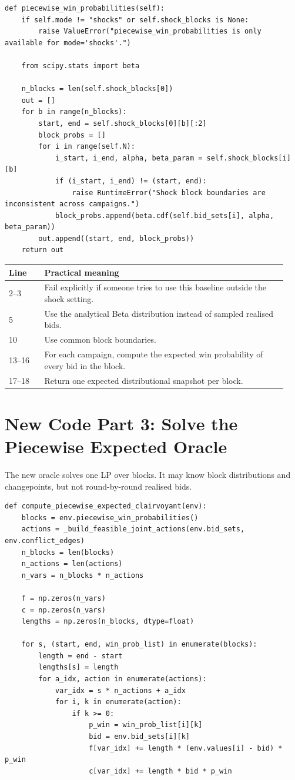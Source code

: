 \documentclass[10pt,a4paper]{article}
\begin{document}
\begin{lstlisting}[style=goodpython]
def piecewise_win_probabilities(self):
    if self.mode != "shocks" or self.shock_blocks is None:
        raise ValueError("piecewise_win_probabilities is only available for mode='shocks'.")

    from scipy.stats import beta

    n_blocks = len(self.shock_blocks[0])
    out = []
    for b in range(n_blocks):
        start, end = self.shock_blocks[0][b][:2]
        block_probs = []
        for i in range(self.N):
            i_start, i_end, alpha, beta_param = self.shock_blocks[i][b]
            if (i_start, i_end) != (start, end):
                raise RuntimeError("Shock block boundaries are inconsistent across campaigns.")
            block_probs.append(beta.cdf(self.bid_sets[i], alpha, beta_param))
        out.append((start, end, block_probs))
    return out
\end{lstlisting}

\begin{tabular}{@{}p{0.12\linewidth}p{0.82\linewidth}@{}}
\toprule
Line & Practical meaning \\
\midrule
2--3 & Fail explicitly if someone tries to use this baseline outside the shock setting. \\
5 & Use the analytical Beta distribution instead of sampled realised bids. \\
10 & Use common block boundaries. \\
13--16 & For each campaign, compute the expected win probability of every bid in the block. \\
17--18 & Return one expected distributional snapshot per block. \\
\bottomrule
\end{tabular}

\section{New Code Part 3: Solve the Piecewise Expected Oracle}
The new oracle solves one LP over blocks. It may know block distributions and changepoints, but not round-by-round realised bids.

\begin{lstlisting}[style=goodpython]
def compute_piecewise_expected_clairvoyant(env):
    blocks = env.piecewise_win_probabilities()
    actions = _build_feasible_joint_actions(env.bid_sets, env.conflict_edges)
    n_blocks = len(blocks)
    n_actions = len(actions)
    n_vars = n_blocks * n_actions

    f = np.zeros(n_vars)
    c = np.zeros(n_vars)
    lengths = np.zeros(n_blocks, dtype=float)

    for s, (start, end, win_prob_list) in enumerate(blocks):
        length = end - start
        lengths[s] = length
        for a_idx, action in enumerate(actions):
            var_idx = s * n_actions + a_idx
            for i, k in enumerate(action):
                if k >= 0:
                    p_win = win_prob_list[i][k]
                    bid = env.bid_sets[i][k]
                    f[var_idx] += length * (env.values[i] - bid) * p_win
                    c[var_idx] += length * bid * p_win
\end{lstlisting}
\end{document}
